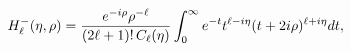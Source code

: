 \[\mathop{{H^{-}_{\ell}}\/}\nolimits\!\left(\eta,\rho\right)=\frac{e^{-i\rho}%
\rho^{-\ell}}{(2\ell+1)!\mathop{C_{\ell}\/}\nolimits\!\left(\eta\right)}\int_{%
0}^{\infty}e^{-t}t^{\ell-i\eta}(t+2i\rho)^{\ell+i\eta}dt,\]